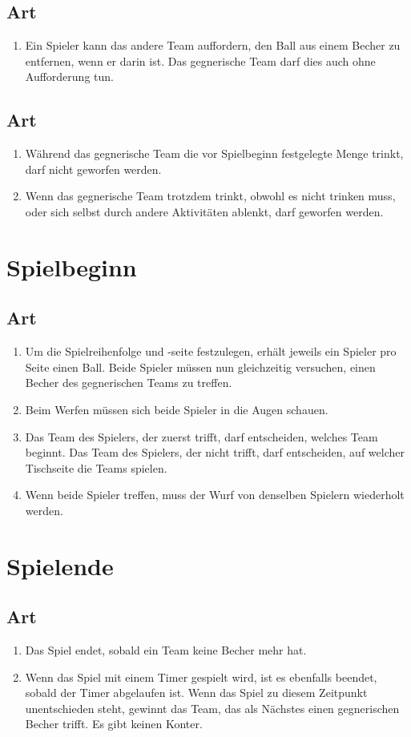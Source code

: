 \documentclass[a4paper,11pt]{scrartcl}
\newcommand{\enum}[1]{\begin{enumerate}[label=(\arabic*)]#1\end{enumerate}}
\newcommand{\art}[2]{\subsection*{#1} \enum{#2}}
\newcounter{art}
\begin{document}
    \art{Art \theart}{
        \item
            Ein Spieler kann das andere Team auffordern, den Ball aus einem Becher zu entfernen, wenn er darin ist. Das gegnerische Team darf dies auch ohne Aufforderung tun.
    }

    \art{Art \theart}{
        \item
            Während das gegnerische Team die vor Spielbeginn festgelegte Menge trinkt, darf nicht geworfen werden.
        \item
            Wenn das gegnerische Team trotzdem trinkt, obwohl es nicht trinken muss, oder sich selbst durch andere Aktivitäten ablenkt, darf geworfen werden.
    }

\section{Spielbeginn}
    \art{Art \theart}{
        \item
            Um die Spielreihenfolge und -seite festzulegen, erhält jeweils ein Spieler pro Seite einen Ball. Beide Spieler müssen nun gleichzeitig versuchen, einen Becher des gegnerischen Teams zu treffen.
        \item
            Beim Werfen müssen sich beide Spieler in die Augen schauen.
        \item
            Das Team des Spielers, der zuerst trifft, darf entscheiden, welches Team beginnt. Das Team des Spielers, der nicht trifft, darf entscheiden, auf welcher Tischseite die Teams spielen.
        \item
            Wenn beide Spieler treffen, muss der Wurf von denselben Spielern wiederholt werden.
    }

\section{Spielende}
    \art{Art \theart}{
        \item
            Das Spiel endet, sobald ein Team keine Becher mehr hat.
        \item
            Wenn das Spiel mit einem Timer gespielt wird, ist es ebenfalls beendet, sobald der Timer abgelaufen ist. Wenn das Spiel zu diesem Zeitpunkt unentschieden steht, gewinnt das Team, das als Nächstes einen gegnerischen Becher trifft. Es gibt keinen Konter.
    }
\end{document}

